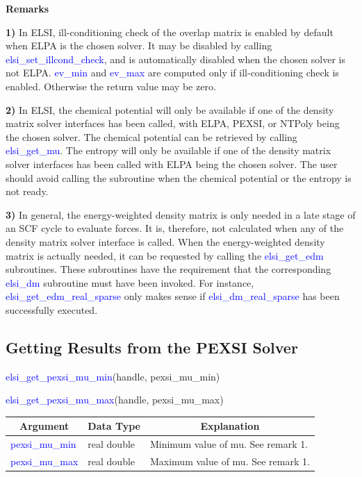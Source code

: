 \documentclass{report}
\begin{document}
\textbf{Remarks}

\textbf{1)} In ELSI, ill-conditioning check of the overlap matrix is enabled by default when ELPA is the chosen solver.  It may be disabled by calling \textcolor{blue}{elsi\_set\_illcond\_check}, and is automatically disabled when the chosen solver is not ELPA.  \textcolor{blue}{ev\_min} and \textcolor{blue}{ev\_max} are computed only if ill-conditioning check is enabled.  Otherwise the return value may be zero.

\textbf{2)} In ELSI, the chemical potential will only be available if one of the density matrix solver interfaces has been called, with ELPA, PEXSI, or NTPoly being the chosen solver.  The chemical potential can be retrieved by calling \textcolor{blue}{elsi\_get\_mu}.  The entropy will only be available if one of the density matrix solver interfaces has been called with ELPA being the chosen solver.  The user should avoid calling the subroutine when the chemical potential or the entropy is not ready.

\textbf{3)} In general, the energy-weighted density matrix is only needed in a late stage of an SCF cycle to evaluate forces.  It is, therefore, not calculated when any of the density matrix solver interface is called.  When the energy-weighted density matrix is actually needed, it can be requested by calling the \textcolor{blue}{elsi\_get\_edm} subroutines.  These subroutines have the requirement that the corresponding \textcolor{blue}{elsi\_dm} subroutine must have been invoked.  For instance, \textcolor{blue}{elsi\_get\_edm\_real\_sparse} only makes sense if \textcolor{blue}{elsi\_dm\_real\_sparse} has been successfully executed.

\subsection{Getting Results from the PEXSI Solver}
\label{subsec:getter_pexsi}
\begin{labeling}{\hspace{6cm}}
\item [\hspace{0.3cm} \textcolor{blue}{elsi\_get\_pexsi\_mu\_min}(handle, pexsi\_mu\_min)]
\item [\hspace{0.3cm} \textcolor{blue}{elsi\_get\_pexsi\_mu\_max}(handle, pexsi\_mu\_max)]
\end{labeling}

\begin{tabular}[]{|p{30mm}|p{45mm}|p{90mm}|}
\hline
\multicolumn{1}{|c|}{\textbf{Argument}} & \multicolumn{1}{c|}{\textbf{Data Type}} & \multicolumn{1}{c|}{\textbf{Explanation}}\\
\hline
\textcolor{blue}{pexsi\_mu\_min} & real double & Minimum value of mu.  See remark 1.\\
\hline
\textcolor{blue}{pexsi\_mu\_max} & real double & Maximum value of mu.  See remark 1.\\
\hline
\end{tabular}
\end{document}
